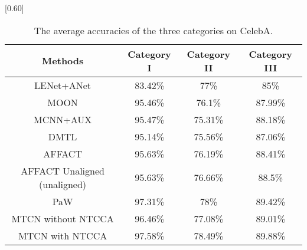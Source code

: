 \documentclass{sig-alternate-05-2015}
\begin{document}
\begin{table}[!hbpt]
\centering
\caption{The average accuracies of the three categories on CelebA.}
\scalebox{0.65}[0.60]{%
\begin{tabular}{c|c|c|c}
\toprule[2pt]
\textbf{Methods} & \textbf{Category I}&\textbf{Category II}&\textbf{Category III}\\\midrule[1pt]
LENet+ANet\cite{7410782}&83.42\%&77\%&85\%\\
\hline
MOON\cite{rudd2016moon}&95.46\%&76.1\%&87.99\%\\
\hline
MCNN+AUX\cite{hand2017attributes}&95.47\%&75.31\%&88.18\%\\
\hline
DMTL\cite{Han2017Heterogeneous}&95.14\%&75.56\%&87.06\%\\
\hline
AFFACT\cite{gunther2016affact}&95.63\%&76.19\%&88.41\%\\
\hline
AFFACT Unaligned\cite{gunther2016affact} (unaligned)&95.63\%&76.66\%&88.5\%\\
\hline
PaW\cite{ding2017deep}&97.31\%&78\%&89.42\%\\
\hline
MTCN without NTCCA&96.46\%&77.08\%&89.01\%\\
\hline
MTCN with NTCCA&97.58\%&78.49\%&89.88\%\\
\bottomrule[2pt]
\end{tabular}}
\label{tab:025}
\end{table}


\end{document}
